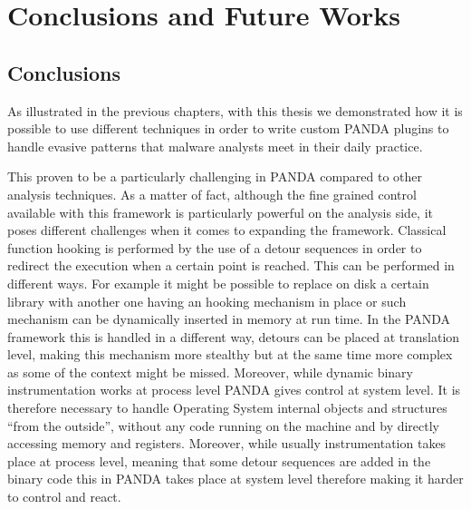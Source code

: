 \chapter{Conclusions and Future Works}
\label{chap:6}

\section{Conclusions}

As illustrated in the previous chapters, with this thesis we demonstrated how it is possible to use different techniques in order to write custom PANDA plugins to handle evasive patterns that malware analysts meet in their daily practice.

This proven to be a particularly challenging in PANDA compared to other analysis techniques. As a matter of fact, although the fine grained control available with this framework is particularly powerful on the analysis side, it poses different challenges when it comes to expanding the framework. Classical function hooking is performed by the use of a detour sequences in order to redirect the execution when a certain point is reached. This can be performed in different ways. For example it might be possible to replace on disk a certain library with another one having an hooking mechanism in place or such mechanism can be dynamically inserted in memory at run time. In the PANDA framework this is handled in a different way, detours can be placed at translation level, making this mechanism more stealthy but at the same time more complex as some of the context might be missed. Moreover, while dynamic binary instrumentation works at process level PANDA gives control at system level. It is therefore necessary to handle Operating System internal objects and structures ``from the outside'', without any code running on the machine and by directly accessing memory and registers. Moreover, while usually instrumentation takes place at process level, meaning that some detour sequences are added in the binary code this in PANDA takes place at system level therefore making it harder to control and react.


